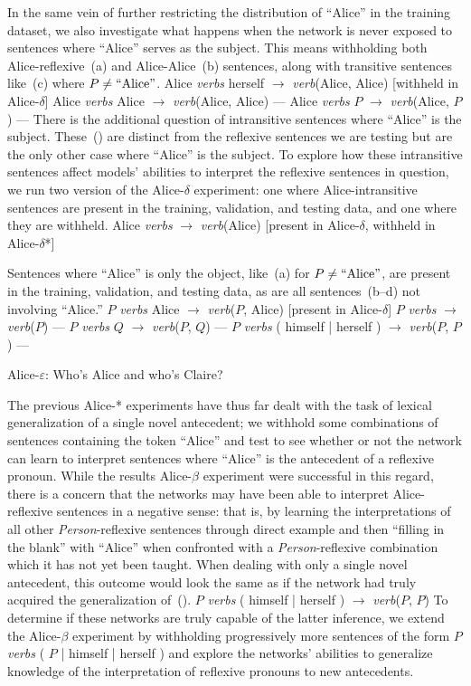 In the same vein of further restricting the distribution of ``Alice'' in the
training dataset, we also investigate what happens when the network is never
exposed to sentences where ``Alice'' serves as the subject. This means 
withholding both Alice-reflexive~(\nextx a) and Alice-Alice~(\nextx b)
sentences, along with transitive sentences like~(\nextx c) where 
$P \not= \hbox{``Alice''}$.
\pex
	\a Alice {\em verbs} herself $\to$ {\em verb}(Alice, Alice) \hfill [withheld in Alice-$\delta$]
	\a Alice {\em verbs} Alice $\to$ {\em verb}(Alice, Alice) \hfill ---
	\a Alice {\em verbs} $P$ $\to$ {\em verb}(Alice, $P$) \hfill ---
\xe
There is the additional question of intransitive sentences where ``Alice'' is
the subject. These~(\nextx) are distinct from the reflexive sentences we are
testing but are the only other case where ``Alice'' is the subject. To explore
how these intransitive sentences affect models' abilities to interpret the
reflexive sentences in question, we run two version of the Alice-$\delta$ 
experiment: one where Alice-intransitive sentences are present in the training,
validation, and testing data, and one where they are withheld.
\ex
	Alice {\em verbs} $\to$ {\em verb}(Alice) \hfill [present in Alice-$\delta$, withheld in Alice-$\delta$*]
\xe

Sentences where ``Alice'' is only the object, like~(\nextx a) for 
$P \not= \hbox{``Alice''}$, are present in the training, validation, and 
testing data, as are all sentences~(\nextx b--d) not involving ``Alice.''
\pex
	\a $P$ {\em verbs} Alice $\to$ {\em verb}($P$, Alice) \hfill [present in Alice-$\delta$]
	\a $P$ {\em verbs} $\to$ {\em verb}($P$) \hfill ---
	\a $P$ {\em verbs} $Q$ $\to$ {\em verb}($P$, $Q$) \hfill ---
	\a $P$ {\em verbs} ( himself | herself ) $\to$ {\em verb}($P$, $P$) \hfill ---
\xe

\ssec Alice-$\varepsilon$: Who's Alice and who's Claire?

The previous Alice-* experiments have thus far dealt with the task of lexical 
generalization of a single novel antecedent; we withhold some combinations of
sentences containing the token ``Alice'' and test to see whether or not the
network can learn to interpret sentences where ``Alice'' is the antecedent 
of a reflexive pronoun. While the results Alice-$\beta$ experiment were 
successful  in this regard, there is a concern that the networks may have been 
able to interpret Alice-reflexive sentences in a negative sense: that is, by 
learning the interpretations of all other {\em Person}-reflexive sentences 
through direct example and then ``filling in the blank'' with ``Alice'' when 
confronted with a {\em Person}-reflexive combination which it has not yet been 
taught. When dealing with only a single novel antecedent, this outcome would 
look the same as if the network had truly acquired the generalization 
of~(\nextx).
\ex
	$P$ {\em verbs} ( himself | herself ) $\to$ {\em verb}($P$, $P$)
\xe
To determine if these networks are truly capable of the latter inference, we
extend the Alice-$\beta$ experiment by withholding progressively more 
sentences of the form 
\ex
	$P$ {\em verbs} ( $P$ | himself | herself )
\xe
and explore the networks' abilities to generalize knowledge of the 
interpretation of reflexive pronouns to new antecedents.


